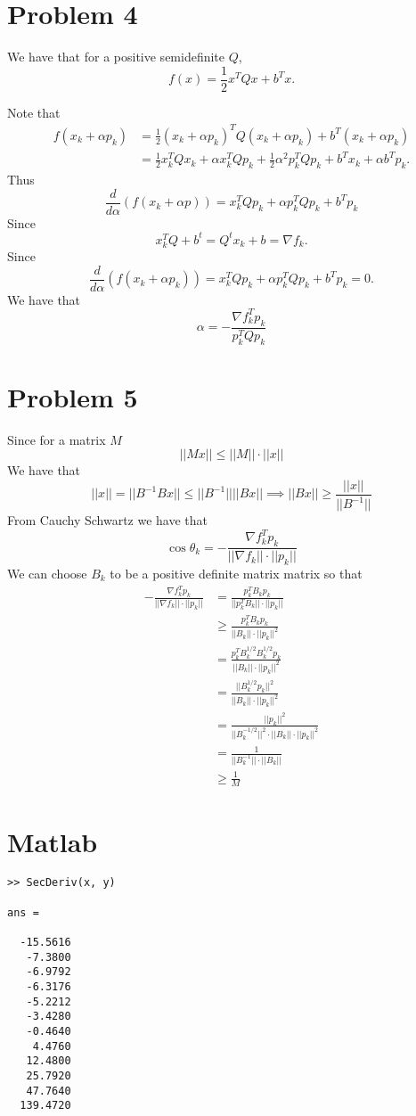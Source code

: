 \documentclass{article}
\begin{document}
\section*{Problem 4}
We have that for a positive semidefinite $Q$,
\[
	f(x) = \frac{1}{2}x^TQx + b^Tx.
\]


Note that 
\begin{align*}
	f(x_k + \alpha p_k) &= \frac{1}{2}(x_k + \alpha p_k)^TQ(x_k + \alpha p_k) + b^T(x_k + \alpha p_k) \\
	&= \frac{1}{2}x_k^TQx_k + \alpha x_k^TQp_k + \frac{1}{2}\alpha^2p_k^TQp_k + b^Tx_k + \alpha b^Tp_k.
\end{align*}
Thus 
\[
	\frac{d}{d \alpha}(f(x_k + \alpha p)) = x_k^TQp_k + \alpha p_k^TQp_k + b^Tp_k
\]
Since 
\[
	x_k^TQ + b^t = Q^tx_k + b = \nabla f_k.
\]
Since 
\[
	\frac{d}{d \alpha}(f(x_k + \alpha p_k)) = x_k^TQp_k + \alpha p_k^TQp_k + b^Tp_k = 0.
\]
We have that 
\[
	\alpha = -\frac{\nabla f_k^T p_k}{p_k^TQp_k}
\]
\newpage 

\section*{Problem 5}
Since for a matrix $M$
\[
	||Mx|| \leq ||M||\cdot ||x||
\]
We have that 
\[
	||x|| = ||B^{-1}Bx|| \leq ||B^{-1}|| ||Bx|| \implies 
	||Bx|| \geq \frac{||x||}{||B^{-1}||}
\]
From Cauchy Schwartz we have that 
\[
	\cos \theta_k = - \frac{\nabla f_k^T p_k}{||\nabla f_k||\cdot ||p_k||}
\]
We can choose $B_k$ to be a positive definite matrix matrix so that
\begin{align*}
	-\frac{\nabla f_k^T p_k}{||\nabla f_k||\cdot ||p_k||} &= \frac{p_k^T B_k p_k}{||p_k^T B_k||\cdot ||p_k||} \\
	&\geq \frac{p_k^T B_k p_k}{||B_k||\cdot ||p_k||^2} \\
	&= \frac{p_k^T B_k^{1/2} B_k^{1/2}p_k}{||B_k||\cdot ||p_k||^2} \\
	&= \frac{||B_k^{1/2}p_k||^2}{||B_k||\cdot ||p_k||^2} \\
	&= \frac{||p_k||^2}{||B_k^{-1/2}||^2 \cdot ||B_k||\cdot ||p_k||^2} \\
    &= \frac{1}{||B_k^{-1}|| \cdot ||B_k||} \\
	& \geq \frac{1}{M}
\end{align*}
\newpage 

\section*{Matlab}

\begin{verbatim}
>> SecDeriv(x, y)

ans =

  -15.5616
   -7.3800
   -6.9792
   -6.3176
   -5.2212
   -3.4280
   -0.4640
    4.4760
   12.4800
   25.7920
   47.7640
  139.4720
\end{verbatim}
\end{document}
